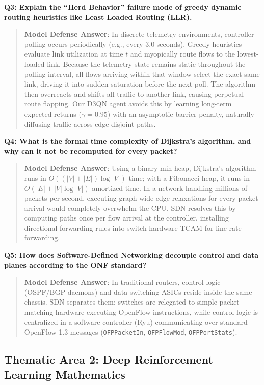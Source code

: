 \documentclass[12pt,a4paper,oneside]{report}
\begin{document}
\noindent\textbf{Q3: Explain the ``Herd Behavior'' failure mode of greedy dynamic routing heuristics like Least Loaded Routing (LLR).}
\begin{quote}
\small
\textbf{Model Defense Answer}: In discrete telemetry environments, controller polling occurs periodically (e.g., every 3.0 seconds). Greedy heuristics evaluate link utilization at time $t$ and myopically route flows to the lowest-loaded link. Because the telemetry state remains static throughout the polling interval, all flows arriving within that window select the exact same link, driving it into sudden saturation before the next poll. The algorithm then overreacts and shifts all traffic to another link, causing perpetual route flapping. Our D3QN agent avoids this by learning long-term expected returns ($\gamma = 0.95$) with an asymptotic barrier penalty, naturally diffusing traffic across edge-disjoint paths.
\end{quote}

\noindent\textbf{Q4: What is the formal time complexity of Dijkstra's algorithm, and why can it not be recomputed for every packet?}
\begin{quote}
\small
\textbf{Model Defense Answer}: Using a binary min-heap, Dijkstra's algorithm runs in $O((|V| + |E|) \log |V|)$ time; with a Fibonacci heap, it runs in $O(|E| + |V| \log |V|)$ amortized time. In a network handling millions of packets per second, executing graph-wide edge relaxations for every packet arrival would completely overwhelm the CPU. SDN resolves this by computing paths once per flow arrival at the controller, installing directional forwarding rules into switch hardware TCAM for line-rate forwarding.
\end{quote}

\noindent\textbf{Q5: How does Software-Defined Networking decouple control and data planes according to the ONF standard?}
\begin{quote}
\small
\textbf{Model Defense Answer}: In traditional routers, control logic (OSPF/BGP daemons) and data switching ASICs reside inside the same chassis. SDN separates them: switches are relegated to simple packet-matching hardware executing OpenFlow instructions, while control logic is centralized in a software controller (Ryu) communicating over standard OpenFlow 1.3 messages (\texttt{OFPPacketIn}, \texttt{OFPFlowMod}, \texttt{OFPPortStats}).
\end{quote}

\subsection{Thematic Area 2: Deep Reinforcement Learning Mathematics}
\end{document}

